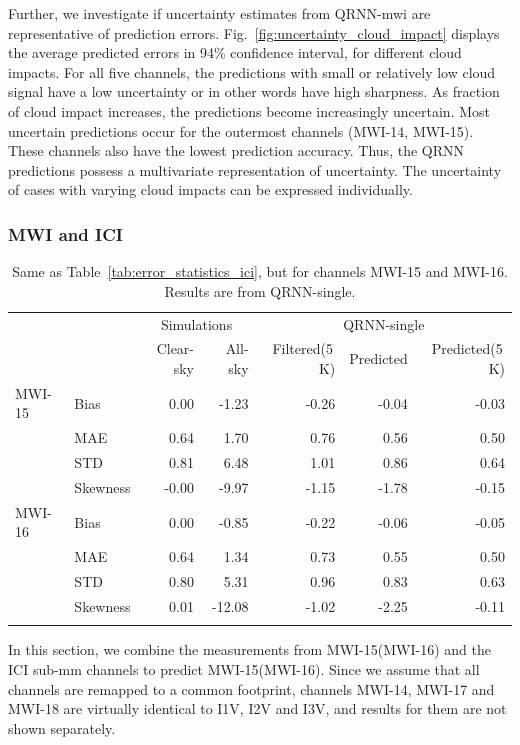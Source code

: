 \documentclass[amt, manuscript]{copernicus}
\begin{document}
Further, we investigate if uncertainty estimates from QRNN-mwi are representative of prediction errors. Fig.~\ref{fig:uncertainty_cloud_impact} displays the average predicted errors in 94\% confidence interval, for different cloud impacts. For all five channels, the predictions with small or relatively low cloud signal have a low uncertainty or in other words have high sharpness. As fraction of cloud impact increases, the predictions become increasingly uncertain. Most uncertain predictions occur for the outermost channels (MWI-14, MWI-15). These channels also have the lowest prediction accuracy.  Thus, the QRNN predictions possess a multivariate representation of uncertainty. The uncertainty of cases with varying cloud impacts can be expressed individually.

\subsubsection{MWI and ICI}
\begin{table}[t]
	\caption{Same as Table~\ref{tab:error_statistics_ici}, but for channels MWI-15 and MWI-16. Results are from QRNN-single.}
	\label{tab:statistics_mwi}
	\begin{tabular}{llrr|rrr}
		\tophline
				&&\multicolumn{2}{c|}{Simulations}& \multicolumn{3}{c}{QRNN-single} \\
				\cline{3-7}
				&&   Clear-sky &   All-sky &  Filtered(5\,K) & Predicted & Predicted(5\,K) \\
		\middlehline
		MWI-15  &Bias     &  0.00 & -1.23 & -0.26 & -0.04 & -0.03 \\
				&MAE      &  0.64 &  1.70 &  0.76 &  0.56 &  0.50 \\
				&STD      &  0.81 &  6.48 &  1.01 &  0.86 &  0.64 \\
				&Skewness & -0.00 & -9.97 & -1.15 & -1.78 & -0.15 \\
		\middlehline
		MWI-16  &Bias     & 0.00 &  -0.85 & -0.22 & -0.06 & -0.05 \\
				&MAE      & 0.64 &   1.34 &  0.73 &  0.55 &  0.50 \\
				&STD      & 0.80 &   5.31 &  0.96 &  0.83 &  0.63 \\
				&Skewness & 0.01 & -12.08 & -1.02 & -2.25 & -0.11 \\
		\bottomhline			
	\end{tabular}	
	\belowtable{} %
\end{table}
In this section, we combine the measurements from MWI-15(MWI-16) and the ICI sub-mm channels to predict MWI-15(MWI-16). Since we assume that all channels are remapped to a common footprint, channels MWI-14, MWI-17 and MWI-18 are virtually identical to I1V, I2V and I3V, and results for them are not shown separately.
\end{document}
